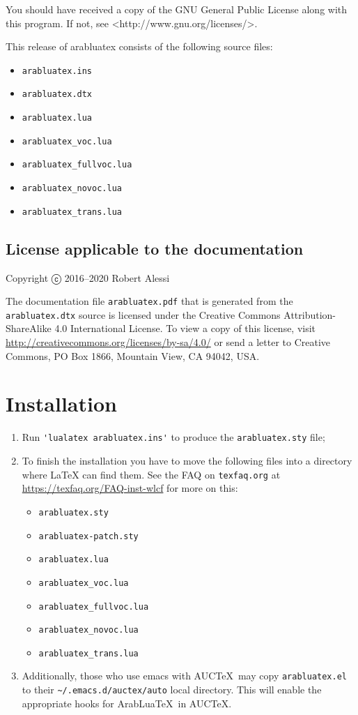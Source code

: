 \documentclass{article}
\begin{document}
You should have received a copy of the GNU General Public License
along with this program.  If not, see
<http://www.gnu.org/licenses/>.

This release of arabluatex consists of the following
source files:
\begin{itemize}
\item \verb|arabluatex.ins|
\item \verb|arabluatex.dtx|
\item \verb|arabluatex.lua|
\item \verb|arabluatex_voc.lua|
\item \verb|arabluatex_fullvoc.lua|
\item \verb|arabluatex_novoc.lua|
\item \verb|arabluatex_trans.lua|
\end{itemize}

\subsection*{License applicable to the documentation}
\label{sec:documentation-license}
Copyright ⓒ 2016--2020  Robert Alessi

The documentation file \verb|arabluatex.pdf| that is generated from
the \verb|arabluatex.dtx| source is licensed under the Creative
Commons Attribution-ShareAlike 4.0 International License. To view a
copy of this license, visit
\url{http://creativecommons.org/licenses/by-sa/4.0/} or send a letter
to Creative Commons, PO Box 1866, Mountain View, CA 94042, USA.

\section*{Installation}
\label{sec:installation}
\begin{enumerate}
\item Run \verb+'lualatex arabluatex.ins'+ to produce the
  \verb+arabluatex.sty+ file;
\item To finish the installation you have to move the following files
  into a directory where LaTeX can find them. See the FAQ on
  \verb|texfaq.org| at
  \url{https://texfaq.org/FAQ-inst-wlcf} for more on this:
\begin{itemize}
\item \verb|arabluatex.sty|
\item \verb|arabluatex-patch.sty|
\item \verb|arabluatex.lua|
\item \verb|arabluatex_voc.lua|
\item \verb|arabluatex_fullvoc.lua|
\item \verb|arabluatex_novoc.lua|
\item \verb|arabluatex_trans.lua|
\end{itemize}
\item Additionally, those who use emacs with AUC\TeX\ may copy
  \verb|arabluatex.el| to their \verb|~/.emacs.d/auctex/auto| local
  directory.  This will enable the appropriate hooks for ArabLua\TeX\
  in AUC\TeX.
\end{enumerate}
\end{document}
